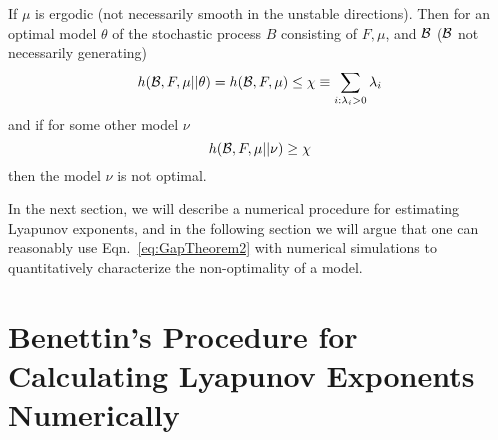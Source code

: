 \begin{theorem} \label{GapTheorem}
  If $\mu$ is ergodic (not necessarily smooth in the unstable
  directions).  Then for an optimal model $\theta$ of the stochastic
  process $B$ consisting of $F,\mu$, and $\cal{B}$ ($\cal{B}$ not
  necessarily generating)
  \begin{equation}
    \label{eq:GapTheorem1}
    h({\cal{B}},F,\mu||\theta) = h({\cal{B}},F,\mu) \leq  \chi \equiv \sum_{i :
    \lambda_i > 0} \lambda_i
  \end{equation}
  and if for some other model $\nu$
  \begin{equation}
    \label{eq:GapTheorem2}
    h({\cal{B}},F,\mu||\nu) \geq \chi
  \end{equation}
  then the model $\nu$ is not optimal.
\end{theorem}

In the next section, we will describe a numerical procedure for
estimating Lyapunov exponents, and in the following section we will
argue that one can reasonably use Eqn.~\eqref{eq:GapTheorem2} with
numerical simulations to quantitatively characterize the
non-optimality of a model.

\section{Benettin's Procedure for Calculating Lyapunov Exponents Numerically}
\label{sec:Benettin}


